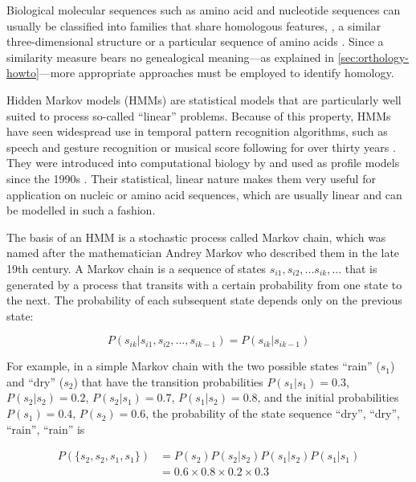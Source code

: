 \label{sec:hmms}
Biological molecular sequences such as amino acid and nucleotide sequences can
usually be classified into families that share homologous features, \eg, a
similar three-dimensional structure or a particular sequence of amino acids
\citep{henikoff1997}. Since a similarity measure bears no genealogical
meaning---as explained in \autoref{sec:orthology-howto}---more appropriate
approaches must be employed to identify homology.

Hidden Markov models (HMMs) are statistical models that are particularly well
suited to process so-called ``linear'' problems. Because of this property, HMMs
have seen widespread use in temporal pattern recognition algorithms, such as
speech and gesture recognition or musical score following for over thirty years
\citep{rabiner1989}. They were introduced into computational biology by
\citet{churchill1989} and used as profile models since the 1990s
\citep{krogh1994}. Their statistical, linear nature makes them very useful for
application on nucleic or amino acid sequences, which are usually linear and can
be modelled in such a fashion. 

The basis of an HMM is a stochastic process called Markov chain, which was named
after the mathematician Andrey Markov who described them in the late 19th
century. A Markov chain is a sequence of states $s_{i1}, s_{i2}, ...  s_{ik},
...$ that is generated by a process that transits with a certain probability
from one state to the next. The probability of each subsequent state depends
only on the previous state:

\begin{equation}
P(s_{ik} | s_{i1}, s_{i2}, ..., s_{ik-1}) = P(s_{ik} | s_{ik-1})
\label{eqn:markov-chain}
\end{equation}

For example, in a simple Markov chain with the two possible states ``rain''
($s_1$) and ``dry'' ($s_2$) that have the transition probabilities $P(s_1|s_1) =
0.3$, $P(s_2|s_2) = 0.2$, $P(s_2|s_1) = 0.7$, $P(s_1|s_2) = 0.8$, and the
initial probabilities $P(s_1) = 0.4$, $P(s_2) = 0.6$, the probability of the
state sequence ``dry'', ``dry'', ``rain'', ``rain'' is

\begin{equation}
	\begin{split}
		P(\{s_2, s_2, s_1, s_1\}) &= P(s_2) P(s_2|s_2) P(s_1|s_2) P(s_1|s_1) \\
		&= 0.6 \times 0.8 \times 0.2 \times 0.3 
	\end{split}
\label{eqn:markov-chain-weather}
\end{equation}

